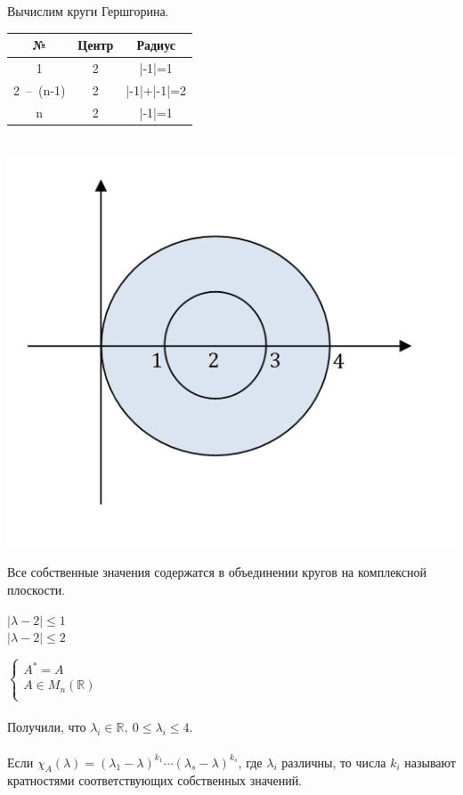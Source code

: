 \documentclass[12pt]{article}
\theoremstyle{definition}
\numberwithin{equation}{section}
\begin{document}
Вычислим круги Гершгорина.
\begin{center}
\begin{tabular}{|c|c|c|}
\hline
№ & Центр & Радиус \\ \hline
1 & 2 & |-1|=1 \\ \hline
2~--~(n-1) & 2 & |-1|+|-1|=2 \\ \hline
n & 2 & |-1|=1 \\ \hline
\end{tabular}\\
\includegraphics[scale=0.8]{l9_3.png}
\end{center}
Все собственные значения содержатся в объединении кругов на комплексной плоскости.\\
\begin{center}
$|\lambda-2|\leqslant 1$\\
$|\lambda-2|\leqslant 2$
\end{center}
$
\left\{
\begin{array}{lcl}
    A^*=A \\
    A\in M_n(\mathbb{R}) \\
\end{array}
\right.
$\\ \\
Получили, что $\lambda_i\in \mathbb{R},~0\leqslant\lambda_i\leqslant 4$.\\
\\
Если $\chi_A(\lambda)=(\lambda_1-\lambda)^{k_1}\cdots(\lambda_s-\lambda)^{k_s}$, где $\lambda_i$ различны, то числа $k_i$ называют кратностями соответствующих собственных значений.\\ \\
\end{document}
